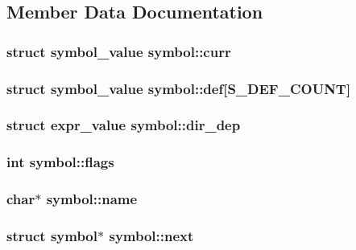 \subsection{Member Data Documentation}
\hypertarget{structsymbol_ad02574e21ac51d3324fe5aa2694e1bc8}{
\subsubsection[{curr}]{\setlength{\rightskip}{0pt plus 5cm}struct {\bf symbol\-\_\-value} symbol\-::curr}}\label{structsymbol_ad02574e21ac51d3324fe5aa2694e1bc8}
\hypertarget{structsymbol_a42e4de60f59ffa3e90af9c714d53020d}{
\subsubsection[{def}]{\setlength{\rightskip}{0pt plus 5cm}struct {\bf symbol\-\_\-value} symbol\-::def\mbox{[}{\bf S\-\_\-\-D\-E\-F\-\_\-\-C\-O\-U\-N\-T}\mbox{]}}}\label{structsymbol_a42e4de60f59ffa3e90af9c714d53020d}
\hypertarget{structsymbol_abf3830a6d14c2bdc296f0065fd9c7b9d}{
\subsubsection[{dir\-\_\-dep}]{\setlength{\rightskip}{0pt plus 5cm}struct {\bf expr\-\_\-value} symbol\-::dir\-\_\-dep}}\label{structsymbol_abf3830a6d14c2bdc296f0065fd9c7b9d}
\hypertarget{structsymbol_a20cdf9053c06f341a9ae57be53522e26}{
\subsubsection[{flags}]{\setlength{\rightskip}{0pt plus 5cm}int symbol\-::flags}}\label{structsymbol_a20cdf9053c06f341a9ae57be53522e26}
\hypertarget{structsymbol_a4fad8f11a2b2d8a21dcb4f5623d6c0fd}{
\subsubsection[{name}]{\setlength{\rightskip}{0pt plus 5cm}char$\ast$ symbol\-::name}}\label{structsymbol_a4fad8f11a2b2d8a21dcb4f5623d6c0fd}
\hypertarget{structsymbol_a183c6511350f3ecc3dbac04c1809ff75}{
\subsubsection[{next}]{\setlength{\rightskip}{0pt plus 5cm}struct {\bf symbol}$\ast$ symbol\-::next}}\label{structsymbol_a183c6511350f3ecc3dbac04c1809ff75}
